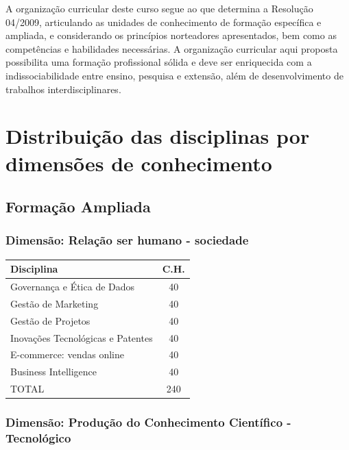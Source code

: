 \documentclass[a4paper, 12pt, openright, oneside, german, french, english, brazil]{abntex2}
\begin{document}
A organização curricular deste curso segue ao que determina a Resolução 04/2009, articulando as unidades de conhecimento de formação específica e ampliada, e considerando os princípios norteadores apresentados, bem como as competências e habilidades necessárias. A organização curricular aqui proposta possibilita uma formação profissional sólida e deve ser enriquecida com a indissociabilidade entre ensino, pesquisa e extensão, além de desenvolvimento de trabalhos interdisciplinares.

\section{Distribuição das disciplinas por dimensões de conhecimento}

\subsection{Formação Ampliada}

\subsubsection{Dimensão: Relação ser humano - sociedade}

\begin{table}[!h]
  \footnotesize
  \centering
  \begin{tabular}{|p{7cm}|c|}
    \hline
    \textbf{Disciplina} & \textbf{C.H.} \\
    \hline
    Governança e Ética de Dados & 40 \\
    \hline
    Gestão de Marketing & 40 \\
    \hline
    Gestão de Projetos & 40 \\
    \hline
    Inovações Tecnológicas e Patentes & 40 \\
    \hline
    E-commerce: vendas online & 40 \\
    \hline
    Business Intelligence & 40 \\
    \hline
    TOTAL & 240 \\
    \hline
  \end{tabular}
\end{table}

\subsubsection{Dimensão: Produção do Conhecimento Científico - Tecnológico}
\end{document}
